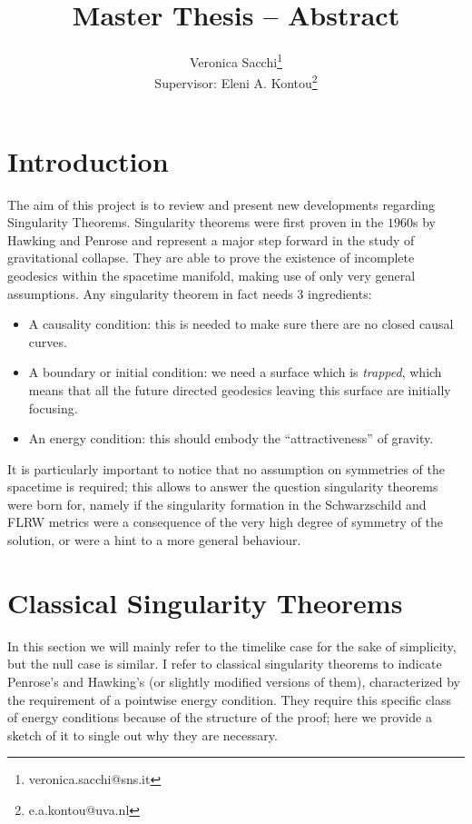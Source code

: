 \documentclass[12pt, a4paper]{article}
\title{Master Thesis -- Abstract}
\author{Veronica Sacchi\thanks{veronica.sacchi@sns.it}\\
Supervisor: Eleni A. Kontou\thanks{e.a.kontou@uva.nl}}
\begin{document}
\maketitle

\section{Introduction}
The aim of this project is to review and present new developments regarding Singularity Theorems.
Singularity theorems were first proven in the \(1960\)s by Hawking \cite{hawking1966occurrence} and Penrose \cite{penrose1965gravitational} and represent a major step forward in the study of gravitational collapse.
They are able to prove  the existence of incomplete geodesics within the spacetime manifold, making use of only very general assumptions.
Any singularity theorem in fact needs \(3\) ingredients:
\begin{itemize}
	\item A causality condition: this is needed to make sure there are no closed causal curves.
	\item A boundary or initial condition: we need a surface which is \emph{trapped}, which means that all the future directed geodesics leaving this surface are initially focusing.
	\item An energy condition: this should embody the ``attractiveness'' of gravity.
\end{itemize}

It is particularly important to notice that no assumption on symmetries of the spacetime is required; this allows to answer the question singularity theorems were born for, namely if the singularity formation in the Schwarzschild and FLRW metrics were a consequence of the very high degree of symmetry of the solution, or were a hint to a more general behaviour.

\section{Classical Singularity Theorems}
In this section we will mainly refer to the timelike case for the sake of simplicity, but the null case is similar.
I refer to classical singularity theorems to indicate Penrose's and Hawking's (or slightly modified versions of them), characterized by the requirement of a pointwise energy condition.
They require this specific class of energy conditions because of the structure of the proof; here we provide a sketch of it to single out why they are necessary.
\end{document}
